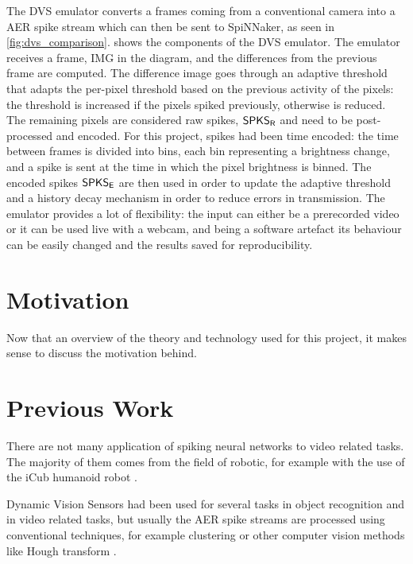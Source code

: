 The DVS emulator converts a frames coming from a conventional camera into a AER spike stream which can then be sent to SpiNNaker, as seen in \cref{fig:dvs_comparison}.  
 shows the components of the DVS emulator. The emulator receives a frame, \textsf{IMG} in the diagram, and the differences from the previous frame are computed. The difference image goes through an adaptive threshold that adapts the per-pixel threshold based on the previous activity of the pixels: the threshold is increased if the pixels spiked previously, otherwise is reduced. The remaining pixels are considered raw spikes, $\text{\textsf{SPKS}}_\text{\textsf{R}}$ and need to be post-processed and encoded. For this project, spikes had been time encoded: the time between frames is divided into bins, each bin representing a brightness change, and a spike is sent at the time in which the pixel brightness is binned. The encoded spikes $\text{\textsf{SPKS}}_\text{\textsf{E}}$ are then used in order to update the adaptive threshold and a history decay mechanism in order to reduce errors in transmission. 
The emulator provides a lot of flexibility: the input can either be a prerecorded video or it can be used live with a webcam, and being a software artefact its behaviour can be easily changed and the results saved for reproducibility. 


\section{Motivation}
Now that an overview of the theory and technology used for this project, it makes sense to discuss the motivation behind. 



\section{Previous Work}
There are not many application of spiking neural networks to video related tasks. The majority of them comes from the field of robotic, for example with the use of the iCub humanoid robot \cite{HernandezGarcia2018}.

Dynamic Vision Sensors had been used for several tasks in object recognition and in video related tasks, but usually the AER spike streams are processed using conventional techniques, for example clustering or other computer vision methods like Hough transform \cite{Glover2016, Glover2017}.